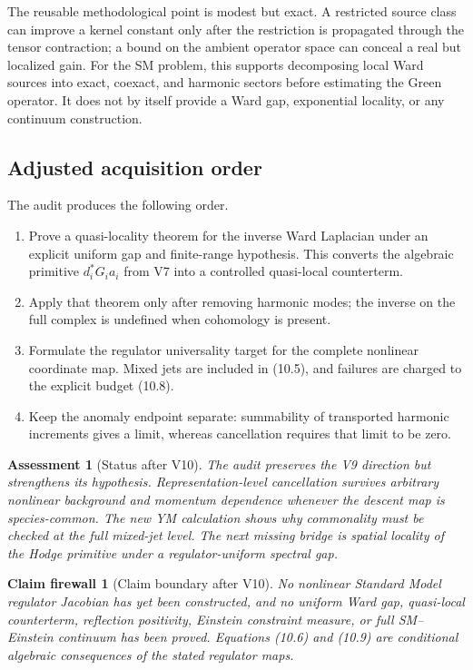 \documentclass[11pt]{article}
\newtheorem{firewall}[theorem]{Claim firewall}
\newtheorem{assessment}[theorem]{Assessment}
\theoremstyle{remark}
\begin{document}
The reusable methodological point is modest but exact.  A restricted
source class can improve a kernel constant only after the restriction
is propagated through the tensor contraction; a bound on the
ambient operator space can conceal a real but localized gain.  For
the SM problem, this supports decomposing local Ward sources into
exact, coexact, and harmonic sectors before estimating the Green
operator.  It does not by itself provide a Ward gap, exponential
locality, or any continuum construction.

\subsection{Adjusted acquisition order}

The audit produces the following order.

\begin{enumerate}
\item Prove a quasi-locality theorem for the inverse Ward Laplacian
      under an explicit uniform gap and finite-range hypothesis.
      This converts the algebraic primitive \(d_i^*G_i a_i\) from
      V7 into a controlled quasi-local counterterm.
\item Apply that theorem only after removing harmonic modes; the
      inverse on the full complex is undefined when cohomology is
      present.
\item Formulate the regulator universality target for the complete
      nonlinear coordinate map.  Mixed jets are included in
      (10.5), and failures are charged to the explicit budget
      (10.8).
\item Keep the anomaly endpoint separate: summability of transported
      harmonic increments gives a limit, whereas cancellation
      requires that limit to be zero.
\end{enumerate}

\begin{assessment}[Status after V10]
\label{ass:v12v10-status}
The audit preserves the V9 direction but strengthens its hypothesis.
Representation-level cancellation survives arbitrary nonlinear
background and momentum dependence whenever the descent map is
species-common.  The new YM calculation shows why commonality must
be checked at the full mixed-jet level.  The next missing bridge is
spatial locality of the Hodge primitive under a regulator-uniform
spectral gap.
\end{assessment}

\begin{firewall}[Claim boundary after V10]
\label{fire:v12v10-claim}
No nonlinear Standard Model regulator Jacobian has yet been
constructed, and no uniform Ward gap, quasi-local counterterm,
reflection positivity, Einstein constraint measure, or full
SM--Einstein continuum has been proved.  Equations (10.6) and (10.9)
are conditional algebraic consequences of the stated regulator
maps.
\end{firewall}
\end{document}
